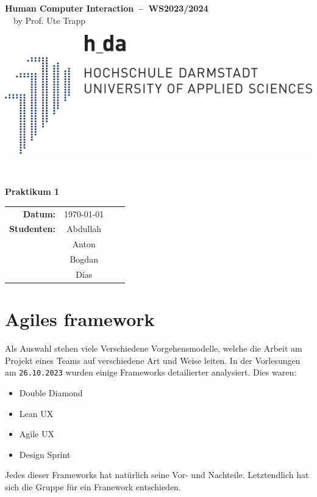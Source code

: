 \documentclass[12pt,a4paper]{scrartcl}
\newcommand{\myLecture}{Human Computer \newline Interaction}
\newcommand{\mySemester}{WS2023/2024}
\newcommand{\myTeacher}{Prof. Ute Trapp}
\newcommand{\myPractical}{Praktikum 1}         %
\newcommand{\myDate}{\today}
\newcommand{\myStudentOne}{Abdullah & & }
\newcommand{\myStudentTwo}{Anton & & }
\newcommand{\myStudentThree}{Bogdan & & }
\newcommand{\myStudentFour}{Días & & }
\newcommand{\myStudentsTable}{
\begin{tabular}{rcll}
    \toprule
    \textbf{Datum:}          & \myDate       & & \\ 
    \textbf{Studenten:}      & \myStudentOne     \\
                            & \myStudentTwo     \\
                            & \myStudentThree     \\ 
                            & \myStudentFour     \\ 
    \bottomrule
\end{tabular}     
}
\def\code#1{\texttt{#1}}
\begin{document}
\begin{minipage}{\linewidth}

    \begin{minipage}{.7\linewidth}
        \textbf{\Huge \myLecture~--~\mySemester\vspace{.5em}}\\
        {\large ~~by \myTeacher\vspace{1em}}\\
    \end{minipage}
    
    \begin{minipage}[t]{.3\linewidth}
        \centering
        \includegraphics[width=\linewidth]{images/hda-blue.pdf}
    \end{minipage}\\
    
    \begin{minipage}{\linewidth}
    \begin{center}
        \textbf{\myPractical}\vspace{.5em}\\
        \myStudentsTable
    \end{center}
    \end{minipage}
\end{minipage}

\tableofcontents	 		%
\newpage

\section{Agiles framework}

Als Auswahl stehen viele Verschiedene Vorgehensmodelle, welche die Arbeit am Projekt eines Teams auf verschiedene Art und Weise leiten. In der Vorlesungen am \code{26.10.2023} wurden einige Frameworks detailierter analysiert. Dies waren:
\begin{itemize}
\item Double Diamond

\item Lean UX

\item Agile UX

\item Design Sprint
\end{itemize}
Jedes dieser Frameworks hat natürlich seine Vor- und Nachteile. Letztendlich hat sich die Gruppe für ein Franework entschieden.
\end{document}
